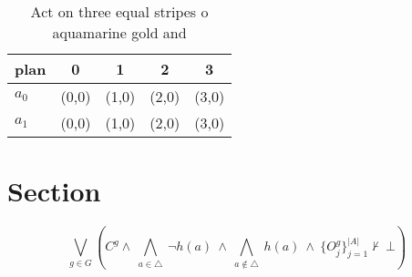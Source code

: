 \documentclass[a4paper]{article}
\begin{document}
\begin{table}
\begin{adjustbox}{width=0.7\columnwidth}
\begin{tabular}{|l|l|l|l|l|}
\hline
\textbf{plan} & \multicolumn{1}{c|}{\textbf{0}} & \multicolumn{1}{c|}{\textbf{1}} & \multicolumn{1}{c|}{\textbf{2}} & \multicolumn{1}{c|}{\textbf{3}} \\ \hline
\textbf{$a_0$}  & (0,0) & (1,0) & (2,0) & (3,0) \\ \hline
\textbf{$a_1$}  & (0,0) & (1,0) & (2,0) & (3,0) \\ \hline
\end{tabular}
\end{adjustbox}
\caption{Act on three equal stripes o aquamarine gold and 
}
\end{table}

\section{Section}

\[\bigvee_{g\in G} (C^g \wedge\ \bigwedge_{a\in \triangle}\ \neg h(a)\ \wedge\ \bigwedge_{a\notin \triangle}\ h(a)\ \wedge\ \{O_j^g\}_{j=1}^{|A|} \nvdash\ \bot )\]
\end{document}
